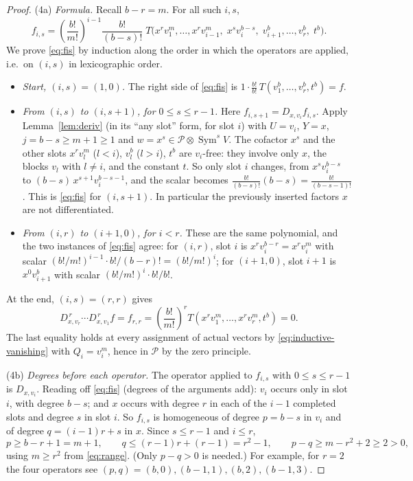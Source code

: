 \documentclass[11pt]{article}
\theoremstyle{remark}
\DeclareMathOperator{\Sym}{Sym}
\newcommand{\D}[2]{D_{#1,#2}}
\newcommand{\PP}{\mathcal P}
\begin{document}
\begin{proof}
(4a) \emph{Formula.} Recall $b-r=m$. For all such $i,s$,
\begin{equation}\label{eq:fis}
 f_{i,s}=\left(\frac{b!}{m!}\right)^{i-1}\frac{b!}{(b-s)!}\;
 T\bigl(x^rv_1^m,\ldots,x^rv_{i-1}^m,\;x^sv_i^{b-s},\;
 v_{i+1}^b,\ldots,v_r^b,\;t^b\bigr).
\end{equation}
We prove \eqref{eq:fis} by induction along the order in which the operators
are applied, i.e.\ on $(i,s)$ in lexicographic order.
\begin{itemize}[leftmargin=1.5em]
\item \emph{Start, $(i,s)=(1,0)$.} The right side of \eqref{eq:fis} is
$1\cdot\frac{b!}{b!}\,T(v_1^b,\dots,v_r^b,t^b)=f$.
\item \emph{From $(i,s)$ to $(i,s+1)$, for $0\le s\le r-1$.} Here
$f_{i,s+1}=\D{x}{v_i}f_{i,s}$. Apply Lemma~\ref{lem:deriv} (in its
``any slot'' form, for slot $i$) with $U=v_i$, $Y=x$, $j=b-s\ge m+1\ge1$
and $w=x^s\in\PP\otimes\Sym^sV$. The cofactor $x^s$ and the other slots
$x^rv_l^m$ ($l<i$), $v_l^b$ ($l>i$), $t^b$ are $v_i$-free: they involve
only $x$, the blocks $v_l$ with $l\ne i$, and the constant $t$. So only
slot $i$ changes, from $x^sv_i^{b-s}$ to $(b-s)\,x^{s+1}v_i^{b-s-1}$, and
the scalar becomes
$\frac{b!}{(b-s)!}(b-s)=\frac{b!}{(b-s-1)!}$. This is \eqref{eq:fis} for
$(i,s+1)$. In particular the previously inserted factors $x$ are not
differentiated.
\item \emph{From $(i,r)$ to $(i+1,0)$, for $i<r$.} These are the same
polynomial, and the two instances of \eqref{eq:fis} agree: for $(i,r)$,
slot $i$ is $x^rv_i^{b-r}=x^rv_i^m$ with scalar
$(b!/m!)^{i-1}\cdot b!/(b-r)!=(b!/m!)^{i}$; for $(i+1,0)$, slot $i+1$ is
$x^0v_{i+1}^b$ with scalar $(b!/m!)^{i}\cdot b!/b!$.
\end{itemize}
At the end, $(i,s)=(r,r)$ gives
\begin{equation}\label{eq:second-composition}
 \D{x}{v_r}^{\,r}\cdots\D{x}{v_1}^{\,r}f=f_{r,r}
 =\left(\frac{b!}{m!}\right)^r
 T(x^rv_1^m,\ldots,x^rv_r^m,t^b)=0.
\end{equation}
The last equality holds at every assignment of actual vectors by
\eqref{eq:inductive-vanishing} with $Q_i=v_i^m$, hence in $\PP$ by the zero
principle.

(4b) \emph{Degrees before each operator.} The operator applied to $f_{i,s}$
with $0\le s\le r-1$ is $\D{x}{v_i}$. Reading off \eqref{eq:fis} (degrees
of the arguments add): $v_i$ occurs only in slot $i$, with degree $b-s$;
and $x$ occurs with degree $r$ in each of the $i-1$ completed slots and
degree $s$ in slot $i$. So $f_{i,s}$ is homogeneous of degree $p=b-s$ in
$v_i$ and of degree $q=(i-1)r+s$ in $x$. Since $s\le r-1$ and $i\le r$,
\[
 p\ge b-r+1=m+1,\qquad q\le(r-1)r+(r-1)=r^2-1,\qquad
 p-q\ge m-r^2+2\ge2>0,
\]
using $m\ge r^2$ from \eqref{eq:range}. (Only $p-q>0$ is needed.) For
example, for $r=2$ the four operators see
$(p,q)=(b,0),(b-1,1),(b,2),(b-1,3)$.


\end{proof}
\end{document}
